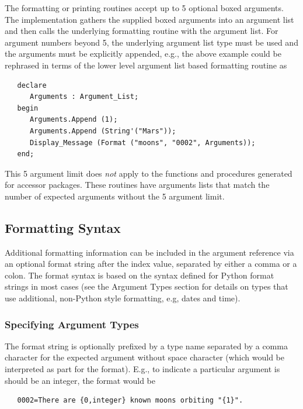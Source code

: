 The formatting or printing routines accept up to 5 optional boxed arguments.
The implementation gathers the supplied boxed arguments into an argument
list and then calls the underlying formatting routine with the argument
list.  For argument numbers beyond 5, the underlying argument list type must be
used and the arguments must be explicitly appended, e.g., the above
example could be rephrased in terms of the lower level argument list based
formatting routine as
\begin{xmpl}
\begin{verbatim}
   declare
      Arguments : Argument_List;
   begin
      Arguments.Append (1);
      Arguments.Append (String'("Mars"));
      Display_Message (Format ("moons", "0002", Arguments));
   end;
\end{verbatim}
\end{xmpl}

This 5 argument limit does \textit{not} apply to the functions and procedures
generated for accessor packages.  These routines have arguments lists that
match the number of expected arguments without the 5 argument limit.

\subsection{Formatting Syntax}

Additional formatting information can be included in the argument reference
via an optional format string after the index value, separated by either a
comma or a colon.  The format syntax is based on the syntax defined for Python
format strings in most cases (see the Argument Types section for details
on types that use additional, non-Python style formatting, e.g, dates and
time).

\subsubsection{Specifying Argument Types}

The format string is optionally prefixed by a type name separated by a comma
character for the expected argument without space character (which would be
interpreted as part for the format).  E.g., to indicate a particular argument
is should be an integer, the format would be
\begin{xmpl}
\begin{verbatim}
   0002=There are {0,integer} known moons orbiting "{1}".
\end{verbatim}
\end{xmpl}

